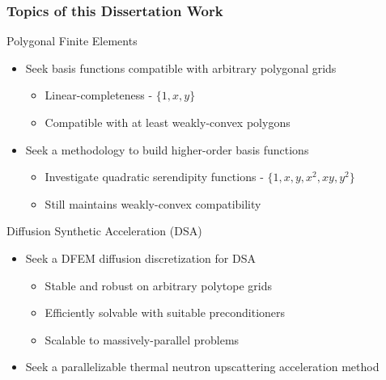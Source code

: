 \documentclass[compress,10pt]{beamer}
\begin{document}
\begin{frame}[t]\frametitle{Topics of this Dissertation Work}
\begin{block}{Polygonal Finite Elements}
\begin{itemize}
\item Seek basis functions compatible with arbitrary polygonal grids
	\begin{itemize}
	\item Linear-completeness - $\{ 1,x,y \}$
	\item Compatible with at least weakly-convex polygons
	\end{itemize}
\item Seek a methodology to build higher-order basis functions
	\begin{itemize}
	\item Investigate quadratic serendipity functions - $\{ 1,x,y ,x^2,xy,y^2\}$
	\item Still maintains weakly-convex compatibility
	\end{itemize}
\end{itemize}
\end{block}
\begin{block}{Diffusion Synthetic Acceleration (DSA)}
\begin{itemize}
\item Seek a DFEM diffusion discretization for DSA
	\begin{itemize}
	\item Stable and robust on arbitrary polytope grids
	\item Efficiently solvable with suitable preconditioners
	\item Scalable to massively-parallel problems
	\end{itemize}
\item Seek a parallelizable thermal neutron upscattering acceleration method
\end{itemize}
\end{block}
\end{frame}
\end{document}
